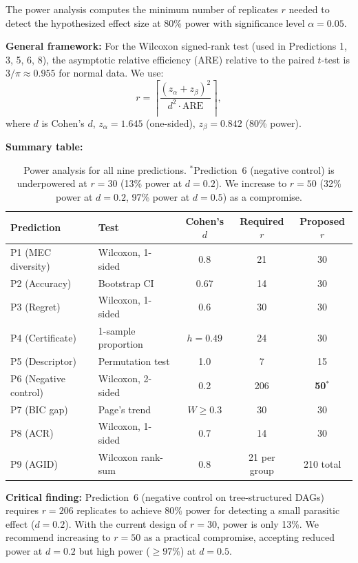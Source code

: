 \documentclass{article}
\theoremstyle{definition}
\theoremstyle{plain}
\theoremstyle{remark}
\begin{document}
The power analysis computes the minimum number of replicates $r$ needed to detect
the hypothesized effect size at 80\% power with significance level $\alpha = 0.05$.

\textbf{General framework:} For the Wilcoxon signed-rank test (used in Predictions
1, 3, 5, 6, 8), the asymptotic relative efficiency (ARE) relative to the paired
$t$-test is $3/\pi \approx 0.955$ for normal data. We use:
\begin{equation}
r = \left\lceil \frac{(z_{\alpha} + z_{\beta})^2}{d^2 \cdot \mathrm{ARE}} \right\rceil,
\end{equation}
where $d$ is Cohen's $d$, $z_\alpha = 1.645$ (one-sided), $z_\beta = 0.842$ (80\% power).

\textbf{Summary table:}

\begin{table}[h]
\centering
\begin{tabular}{llccc}
\toprule
\textbf{Prediction} & \textbf{Test} & \textbf{Cohen's $d$} & \textbf{Required $r$} & \textbf{Proposed $r$} \\
\midrule
P1 (MEC diversity) & Wilcoxon, 1-sided & 0.8 & 21 & 30 \\
P2 (Accuracy) & Bootstrap CI & 0.67 & 14 & 30 \\
P3 (Regret) & Wilcoxon, 1-sided & 0.6 & 30 & 30 \\
P4 (Certificate) & 1-sample proportion & $h = 0.49$ & 24 & 30 \\
P5 (Descriptor) & Permutation test & 1.0 & 7 & 15 \\
P6 (Negative control) & Wilcoxon, 2-sided & 0.2 & 206 & \textbf{50}$^*$ \\
P7 (BIC gap) & Page's trend & $W \geq 0.3$ & 30 & 30 \\
P8 (ACR) & Wilcoxon, 1-sided & 0.7 & 14 & 30 \\
P9 (AGID) & Wilcoxon rank-sum & 0.8 & 21 per group & 210 total \\
\bottomrule
\end{tabular}
\caption{Power analysis for all nine predictions. $^*$Prediction~6 (negative control)
is underpowered at $r = 30$ (13\% power at $d = 0.2$). We increase to $r = 50$
(32\% power at $d = 0.2$, 97\% power at $d = 0.5$) as a compromise.}
\end{table}

\textbf{Critical finding:} Prediction~6 (negative control on tree-structured DAGs)
requires $r = 206$ replicates to achieve 80\% power for detecting a small parasitic
effect ($d = 0.2$). With the current design of $r = 30$, power is only 13\%. We
recommend increasing to $r = 50$ as a practical compromise, accepting reduced power
at $d = 0.2$ but high power ($\geq 97\%$) at $d = 0.5$.
\end{document}
